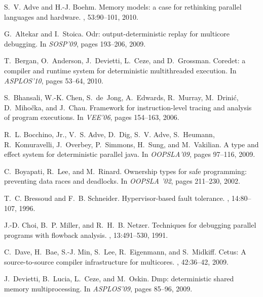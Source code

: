 \documentclass[10pt,onecolumn,letterpaper]{article}
\begin{document}
\small{
\begin{thebibliography}{10}

S.~V. Adve and H.-J. Boehm.
\newblock Memory models: a case for rethinking parallel languages and hardware.
, 53:90--101, 2010.

G.~Altekar and I.~Stoica.
\newblock Odr: output-deterministic replay for multicore debugging.
\newblock In {\em SOSP'09}, pages 193--206, 2009.

T.~Bergan, O.~Anderson, J.~Devietti, L.~Ceze, and D.~Grossman.
\newblock Coredet: a compiler and runtime system for deterministic
  multithreaded execution.
\newblock In {\em ASPLOS'10}, pages 53--64, 2010.

S.~Bhansali, W.-K. Chen, S.~de~Jong, A.~Edwards, R.~Murray,
M.~Drini\'{c},
  D.~Miho\v{c}ka, and J.~Chau.
\newblock Framework for instruction-level tracing and analysis of program
  executions.
\newblock In {\em VEE'06}, pages 154--163, 2006.

R.~L. Bocchino, Jr., V.~S. Adve, D.~Dig, S.~V. Adve, S.~Heumann,
  R.~Komuravelli, J.~Overbey, P.~Simmons, H.~Sung, and M.~Vakilian.
\newblock A type and effect system for deterministic parallel java.
\newblock In {\em OOPSLA'09}, pages 97--116, 2009.

C.~Boyapati, R.~Lee, and M.~Rinard.
\newblock Ownership types for safe programming: preventing data races and
  deadlocks.
\newblock In {\em OOPSLA '02}, pages 211--230, 2002.

T.~C. Bressoud and F.~B. Schneider.
\newblock Hypervisor-based fault tolerance.
, 14:80--107, 1996.

J.-D. Choi, B.~P. Miller, and R.~H.~B. Netzer.
\newblock Techniques for debugging parallel programs with flowback analysis.
, 13:491--530, 1991.

C.~Dave, H.~Bae, S.-J. Min, S.~Lee, R.~Eigenmann, and S.~Midkiff.
\newblock Cetus: A source-to-source compiler infrastructure for multicores.
, 42:36--42, 2009.

J.~Devietti, B.~Lucia, L.~Ceze, and M.~Oskin.
\newblock Dmp: deterministic shared memory multiprocessing.
\newblock In {\em ASPLOS'09}, pages 85--96, 2009.


\end{thebibliography}}
\end{document}
